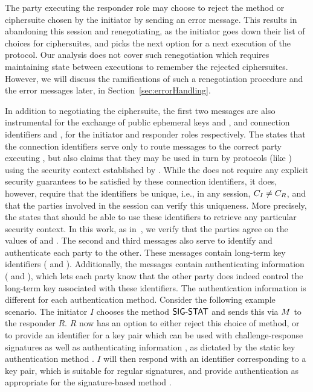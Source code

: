 %
The party executing the responder role may choose to reject the method or
ciphersuite chosen by the initiator by sending an error message.
%
This results in abandoning this session and renegotiating, as the initiator
goes down their list of choices for ciphersuites, and picks the next option for
a next execution of the protocol.
%
Our analysis does not cover such renegotiation which requires maintaining 
state
between executions to remember the rejected ciphersuites.
%
However, we will discuss the ramifications of such a renegotiation procedure
and the error messages later, in Section~\ref{sec:errorHandling}.
%

In addition to negotiating the ciphersuite, the first two messages are
also instrumental for the exchange of public ephemeral keys \mGx{} and 
\mGy{},
and connection identifiers \mCi{} and \mCr{}, for the initiator and responder
roles respectively.
%
The \mSpec{} states that the connection identifiers serve only to route 
messages
to the correct party executing \mEdhoc{}, but also claims that they may be
used in turn by protocols (like \mOscore{}) using the security context
established by \mEdhoc{}.
%
While the \mSpec{} does not require any explicit security guarantees to be
satisfied by these connection identifiers, it does, however, require that the
identifiers be unique, i.e., in any session, $C_I{} \neq C_R{}$, and that the
parties involved in the session can verify this uniqueness.
%
More precisely, the \mSpec{} states that \mOscore{} should be able to use these
identifiers to retrieve any particular security context.
%
In this work, as in~\cite{Norr21}, we verify that the parties agree on the
values of \mCi{} and \mCr{}.
%
The second and third messages also serve to identify and authenticate each
party to the other.
%
These messages contain long-term key identifiers (\mIdcredi{} and 
\mIdcredr{}).
%
Additionally, the messages contain authenticating information
(\mAuthi{} and \mAuthr{}), which lets each
party know that the other party does indeed control the long-term key
associated with these identifiers.
%
The authentication information is different for each authentication method.
%
Consider the following example scenario.
%
The initiator $I$ chooses the method $\textsf{SIG-STAT}{}$ and sends this via
$M{}$ to the responder $R$.
%
$R$ now has an option to either reject this choice of method, or to provide an
identifier \mIdcredr{} for a key pair which can be used with 
challenge-response
signatures 
as well as authenticating information \mAuthr{}, as dictated by
the static key authentication method \mStat{}.
%
$I$ will then respond with an identifier \mIdcredi{} corresponding to a key
pair, which is suitable for regular signatures, and provide authentication
\mAuthi{} as appropriate for the signature-based method \mSig{}.

